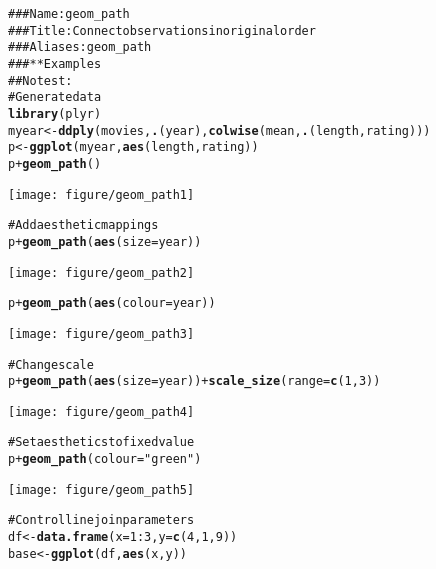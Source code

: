 \documentclass[a4paper,titlepage]{tufte-handout}\usepackage{graphicx, color}
\makeatletter
\def\maxwidth{ %
  \ifdim\Gin@nat@width>\linewidth
    \linewidth
  \else
    \Gin@nat@width
  \fi
}
\newcommand{\hlfunctioncall}[1]{\textcolor[rgb]{0.501960784313725,0,0.329411764705882}{\textbf{#1}}}%
\newcommand{\hlstring}[1]{\textcolor[rgb]{0.6,0.6,1}{#1}}%
\newcommand{\hlcomment}[1]{\textcolor[rgb]{0.180392156862745,0.6,0.341176470588235}{#1}}%
\newenvironment{kframe}{%
 \def\at@end@of@kframe{}%
 \ifinner\ifhmode%
  \def\at@end@of@kframe{\end{minipage}}%
  \begin{minipage}{\columnwidth}%
 \fi\fi%
 \def\FrameCommand##1{\hskip\@totalleftmargin \hskip-\fboxsep
 \colorbox{shadecolor}{##1}\hskip-\fboxsep
     \hskip-\linewidth \hskip-\@totalleftmargin \hskip\columnwidth}%
 \MakeFramed {\advance\hsize-\width
   \@totalleftmargin\z@ \linewidth\hsize
   \@setminipage}}%
 {\par\unskip\endMakeFramed%
 \at@end@of@kframe}
\newenvironment{knitrout}{}{} %
\makeatother
\begin{document}
\begin{knitrout}
\color{fgcolor}\begin{kframe}
\begin{alltt}
\hlcomment{### Name: geom_path}
\hlcomment{### Title: Connect observations in original order}
\hlcomment{### Aliases: geom_path}
\hlcomment{### ** Examples}
\hlcomment{## No test: }
\hlcomment{# Generate data}
\hlfunctioncall{library}(plyr)
myear <- \hlfunctioncall{ddply}(movies, \hlfunctioncall{.}(year), \hlfunctioncall{colwise}(mean, \hlfunctioncall{.}(length, rating)))
p <- \hlfunctioncall{ggplot}(myear, \hlfunctioncall{aes}(length, rating))
p + \hlfunctioncall{geom_path}()
\end{alltt}
\end{kframe}\texttt{[image: figure/geom\_path1]} \begin{kframe}\begin{alltt}
\hlcomment{# Add aesthetic mappings}
p + \hlfunctioncall{geom_path}(\hlfunctioncall{aes}(size = year))
\end{alltt}
\end{kframe}\texttt{[image: figure/geom\_path2]} \begin{kframe}\begin{alltt}
p + \hlfunctioncall{geom_path}(\hlfunctioncall{aes}(colour = year))
\end{alltt}
\end{kframe}\texttt{[image: figure/geom\_path3]} \begin{kframe}\begin{alltt}
\hlcomment{# Change scale}
p + \hlfunctioncall{geom_path}(\hlfunctioncall{aes}(size = year)) + \hlfunctioncall{scale_size}(range = \hlfunctioncall{c}(1, 3))
\end{alltt}
\end{kframe}\texttt{[image: figure/geom\_path4]} \begin{kframe}\begin{alltt}
\hlcomment{# Set aesthetics to fixed value}
p + \hlfunctioncall{geom_path}(colour = \hlstring{"green"})
\end{alltt}
\end{kframe}\texttt{[image: figure/geom\_path5]} \begin{kframe}\begin{alltt}
\hlcomment{# Control line join parameters}
df <- \hlfunctioncall{data.frame}(x = 1:3, y = \hlfunctioncall{c}(4, 1, 9))
base <- \hlfunctioncall{ggplot}(df, \hlfunctioncall{aes}(x, y))

\end{alltt}
\end{kframe}
\end{knitrout}
\end{document}
